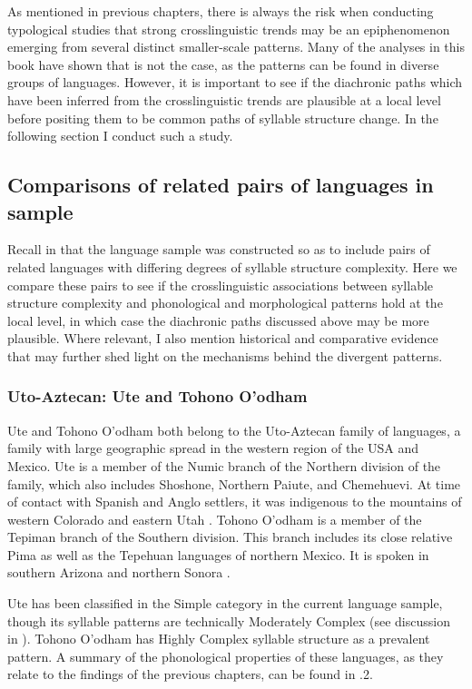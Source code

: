   As mentioned in previous chapters, there is always the risk when conducting typological studies that strong crosslinguistic trends may be an epiphenomenon emerging from several distinct smaller-scale patterns. Many of the analyses in this book have shown that is not the case, as the patterns can be found in diverse groups of languages. However, it is important to see if the diachronic paths which have been inferred from the crosslinguistic trends are plausible at a local level before positing them to be common paths of syllable structure change. In the following section I conduct such a study.

\subsection{Comparisons of related pairs of languages in sample}\label{sec:8.4.3}

  Recall in  that the language sample was constructed so as to include pairs of related languages with differing degrees of syllable structure complexity. Here we compare these pairs to see if the crosslinguistic associations between syllable structure complexity and phonological and morphological patterns hold at the local level, in which case the diachronic paths discussed above may be more plausible. Where relevant, I also mention historical and comparative evidence that may further shed light on the mechanisms behind the divergent patterns.

\subsubsection{{Uto-Aztecan:} {Ute} {and} {Tohono} {O’odham}}\label{sec:8.4.3.1}

  Ute and Tohono O’odham both belong to the Uto-Aztecan family of languages, a family with large geographic spread in the western region of the USA and Mexico. Ute is a member of the Numic branch of the Northern division of the family, which also includes Shoshone, Northern Paiute, and Chemehuevi. At time of contact with Spanish and Anglo settlers, it was indigenous to the mountains of western Colorado and eastern Utah \citep{Givón2011}. Tohono O’odham is a member of the Tepiman branch of the Southern division. This branch includes its close relative Pima as well as the Tepehuan languages of northern Mexico. It is spoken in southern Arizona and northern Sonora \citep{Zepeda1983}.

  Ute has been classified in the Simple category in the current language sample, though its syllable patterns are technically Moderately Complex (see discussion in ). Tohono O’odham has Highly Complex syllable structure as a prevalent pattern. A summary of the phonological properties of these languages, as they relate to the findings of the previous chapters, can be found in .2.

